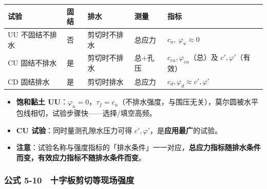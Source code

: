 \documentclass[
]{article}
\newcounter{none} %
\providecommand{\tightlist}{%
  \setlength{\itemsep}{0pt}\setlength{\parskip}{0pt}}
\begin{document}
{\def\LTcaptype{none} %
\begin{longtable}[]{@{}
  >{\raggedright\arraybackslash}p{}
  >{\raggedright\arraybackslash}p{}
  >{\raggedright\arraybackslash}p{}
  >{\raggedright\arraybackslash}p{}
  >{\raggedright\arraybackslash}p{}@{}}
\toprule\noalign{}
\begin{minipage}[b]{\linewidth}\raggedright
试验
\end{minipage} & \begin{minipage}[b]{\linewidth}\raggedright
固结
\end{minipage} & \begin{minipage}[b]{\linewidth}\raggedright
排水
\end{minipage} & \begin{minipage}[b]{\linewidth}\raggedright
测量
\end{minipage} & \begin{minipage}[b]{\linewidth}\raggedright
指标
\end{minipage} \\
\midrule\noalign{}
\endhead
\bottomrule\noalign{}
\endlastfoot
UU 不固结不排水 & 否 & 剪切时不排水 & 总应力 &
\(c_u,\ \varphi_u\approx0\) \\
CU 固结不排水 & 是 & 剪切时不排水 & 总+孔压 &
\(c_{cu},\varphi_{cu}\)（总）及 \(c',\varphi'\)（有效） \\
CD 固结排水 & 是 & 剪切时排水 & 总应力 &
\(c_d,\varphi_d\approx c',\varphi'\) \\
\end{longtable}
}

\begin{itemize}
\tightlist
\item
  \textbf{饱和黏土
  UU}：\(\varphi_u=0\)，\(\tau_f=c_u\)（不排水强度，与围压无关），莫尔圆被水平包线相切，试验步骤快------选择/填空高频。
\item
  \textbf{CU 试验}：同时量测孔隙水压力可得
  \(c',\varphi'\)，是\textbf{应用最广}的试验。
\item
  \textbf{注意}：试验名称与强度指标的「排水条件」一一对应，\textbf{总应力指标随排水条件而变，有效应力指标不随排水条件而变}。
\end{itemize}

\subsubsection{公式
5-10　十字板剪切等现场强度}\label{ux516cux5f0f-5-10-ux5341ux5b57ux677fux526aux5207ux7b49ux73b0ux573aux5f3aux5ea6}
\end{document}
